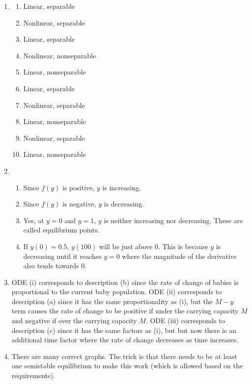\begin{enumerate}
    \item 

        \begin{enumerate}
        \begin{enumerate}
            \item Linear, separable
            \item Nonlinear, separable
            \item Linear, separable
            \item Nonlinear, nonseparable
            \item Linear, nonseparable
            \item Linear, separable
            \item Nonlinear, separable
            \item Linear, nonseparable
            \item Nonlinear, separable
            \item Linear, nonseparable
            
        \end{enumerate}
        \end{enumerate} 

    \item
    \begin{enumerate}
        \item Since $f(y)$ is positive, $y$ is increasing.
        \item Since $f(y)$ is negative, $y$ is decreasing.
        \item Yes, at $y=0$ and $y=1$, $y$ is neither increasing nor decreasing. These are called equilibrium points.
        \item If $y(0)=0.5$, $y(100)$ will be just above 0. This is because $y$ is decreasing until it reaches $y=0$ where the magnitude of the derivative also tends towards 0.
    \end{enumerate}

    \item ODE (i) corresponds to description (b) since the rate of change of babies is proportional to the current baby population. ODE (ii) corresponds to description (a) since it has the same proportionality as (i), but the $M-y$ term causes the rate of change to be positive if under the carrying capacity $M$ and negative if over the carrying capacity $M$. ODE (iii) corresponds to description (c) since it has the same factors as (i), but but now there is an additional time factor where the rate of change decreases as time increases.

    \item There are many correct graphs. The trick is that there needs to be at least one semistable equilibrium to make this work (which is allowed based on the requirements).
\end{enumerate}